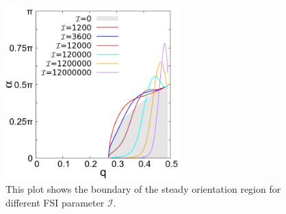 \documentclass[lineno]{JFM-FLM_Au}
\begin{document}
\begin{figure}[!h]
	\begin{center}
		\includegraphics[width=0.6\textwidth]{plot/RESLT_q_alpha_plot_paper/elastic_beam_general.png}
		\caption{This plot shows the boundary of the steady orientation region for different FSI parameter $\mathcal{I}$.}
		\label{fig:26}
	\end{center}
\end{figure}
\end{document}
